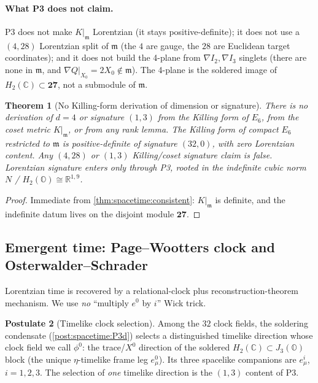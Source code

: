 \documentclass[11pt]{article}
\theoremstyle{plain}
\newtheorem{theorem}{Theorem}[section]
\theoremstyle{definition}
\newtheorem{postulate}[theorem]{Postulate}
\theoremstyle{remark}
\begin{document}
\paragraph{What P3 does not claim.}
P3 does not make $K|_{\mathfrak m}$ Lorentzian (it stays positive-definite); it does not
use a $(4,28)$ Lorentzian split of $\mathfrak m$ (the $4$ are gauge, the $28$ are
Euclidean target coordinates); and it does not build the 4-plane from $\nabla I_2,
\nabla I_3$ singlets (there are none in $\mathfrak m$, and $\nabla Q|_{X_0}=2X_0\notin\mathfrak m$).
The 4-plane is the soldered image of $H_2(\mathbb C)\subset\mathbf{27}$, not a submodule
of $\mathfrak m$.

\begin{theorem}[No Killing-form derivation of dimension or signature]
\label{thm:spacetime:antikilling}
There is no derivation of $d=4$ or signature $(1,3)$ from the Killing form of $E_6$,
from the coset metric $K|_{\mathfrak m}$, or from any rank lemma. The Killing form of
compact $E_6$ restricted to $\mathfrak m$ is positive-definite of signature $(32,0)$,
with zero Lorentzian content. Any $(4,28)$ or $(1,3)$ Killing/coset signature claim is
false. Lorentzian signature enters \emph{only} through P3, rooted in the indefinite
cubic norm $N$ / $H_2(\mathbb O)\cong\mathbb R^{1,9}$.
\end{theorem}
\begin{proof}
Immediate from \autoref{thm:spacetime:consistent}: $K|_{\mathfrak m}$ is definite, and
the indefinite datum lives on the disjoint module $\mathbf{27}$.
\end{proof}

\subsection{Emergent time: Page--Wootters clock and Osterwalder--Schrader}
\label{sec:spacetime:time}

Lorentzian time is recovered by a relational-clock plus reconstruction-theorem
mechanism. We use \emph{no} ``multiply $e^0$ by $i$'' Wick trick.

\begin{postulate}[Timelike clock selection]\label{post:spacetime:clock}
Among the $32$ clock fields, the soldering condensate
(\autoref{post:spacetime:P3d}) selects a distinguished timelike direction whose clock
field we call $\phi^0$: the trace/$X^0$ direction of the soldered
$H_2(\mathbb C)\subset J_3(\mathbb O)$ block (the unique $\eta$-timelike frame leg
$e^0_\mu$). Its three spacelike companions are $e^i_\mu$, $i=1,2,3$. The selection of
\emph{one} timelike direction is the $(1,3)$ content of P3.
\end{postulate}
\end{document}
